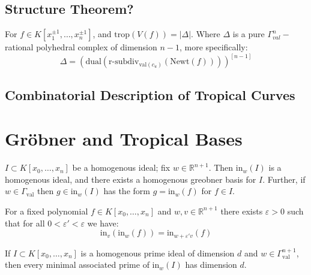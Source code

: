 \subsection{Structure Theorem?}
    \begin{theorem}
        For $f \in K[x_1^{\pm 1}, \dots, x_n^{\pm 1}]$, and $\text{trop}(V(f)) = |\Delta|$. Where $\Delta$ is a pure $\Gamma_{val}^n-$rational polyhedral complex of dimension $n-1$, more specifically:
        \begin{equation*}
            \Delta = \left(\text{dual}\left(\text{r-subdiv}_{\text{val}(c_u)}\left(\text{Newt}(f)\right)\right)\right)^{[n-1]}
        \end{equation*}
    \end{theorem}
\subsection{Combinatorial Description of Tropical Curves}

\section{Gr\"{o}bner and Tropical Bases}  
    \begin{lemma}
        $I \subset K[x_0,\dots, x_n]$ be a homogenous ideal; fix $w\in \mathbb{R}^{n+1}$. 
        Then $\text{in}_{w}(I)$ is a homogenous ideal, and there exists a homogenous greobner basis for $I$. 
        Further, if $w \in \Gamma_{\text{val}}$ then $g \in \text{in}_{w}(I)$ has the form $g = \text{in}_{w}(f)$ for $f \in I$.
    \end{lemma}

    \begin{lemma}
        For a fixed polynomial $f \in K[x_0,\dots,x_n]$ and $w,v \in \mathbb{R}^{n+1}$ there exists $\varepsilon >0$ such that for all $0<\varepsilon ' < \varepsilon$ we have:
        \begin{equation*}
            \text{in}_{v}(\text{in}_{w}(f)) = \text{in}_{w + \varepsilon 'v}(f)
        \end{equation*}
    \end{lemma}
    
    \begin{lemma}
        If $I \subset K[x_0,\dots,x_n]$ is a homogenous prime ideal of dimension $d$ and $w \in \Gamma_{\text{val}}^{n+1}$, then every minimal associated prime of $\text{in}_{w}(I)$ has dimension $d$.
    \end{lemma}

